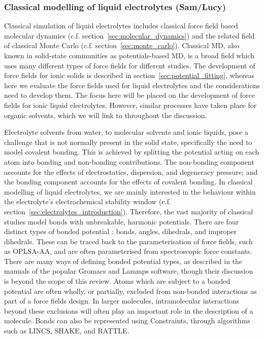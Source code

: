 \documentclass[../main.tex]{subfiles}
\begin{document}
\subsubsection{Classical modelling of liquid electrolytes (Sam/Lucy)}
Classical simulation of liquid electrolytes includes classical force field based molecular dynamics (c.f. section~\ref{sec:molecular_dynamics}) and the related field of classical Monte Carlo (c.f. section~\ref{sec:monte_carlo}). Classical MD, also known in solid-state communities as potentials-based MD, is a broad field which uses many different types of force fields for different studies. The development of force fields for ionic solids is described in section~\ref{sec:potential_fitting}, whereas here we evaluate the force fields used for liquid electrolytes and the considerations need to develop them. The focus here will be placed on the development of force fields for ionic liquid electrolytes. However, similar processes have taken place for organic solvents, which we will link to throughout the discussion.

Electrolyte solvents from water, to molecular solvents and ionic liquids, pose a challenge that is not normally present in the solid state, specifically the need to model covalent bonding. This is achieved by splitting the potential acting on each atom into bonding and non-bonding contributions. The non-bonding component accounts for the effects of electrostatics, dispersion, and degeneracy pressure; and the bonding component accounts for the effects of covalent bonding. In classical modelling of liquid electrolytes, we are mainly interested in the behaviour within the electrolyte's electrochemical stability window (c.f. section~\ref{sec:electrolytes_introduction}). Therefore, the vast majority of classical studies model bonds with unbreakable, harmonic potentials. There are four distinct types of bonded potential \cite{lindahl_gromacs_2021, frenkel_understanding_2002}: bonds, angles, dihedrals, and improper dihedrals. These can be traced back to the parameterisation of force fields, such as OPLSA-AA\cite{canongia_lopes_clp_2012, jorgensen_development_1996}, and are often parameterised from spectroscopic force constants. There are many ways of defining bonded potential types, as described in the manuals of the popular Gromacs\cite{lindahl_gromacs_2021} and Lammps\cite{PLIMPTON19951} software, though their discussion is beyond the scope of this review. Atoms which are subject to a bonded potential are often wholly, or partially, excluded from non-bonded interactions as part of a force fields design. In larger molecules, intramolecular interactions beyond these exclusions will often play an important role in the description of a molecule. Bonds can also be represented using Constraints, through algorithms such as LINCS\cite{hess_lincs_1997}, SHAKE\cite{ryckaert_numerical_1977}, and RATTLE\cite{andersen_rattle_1983}.
\end{document}
